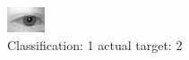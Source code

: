 \begin{figure}[h!]
\begin{center}
\includegraphics[width=0.60\columnwidth]{figures/ID424_class_1_target_2.png}
\end{center}
\caption{ Classification: 1 actual target: 2}
\label{fig:ID424_class_1_target_2}
\end{figure}
